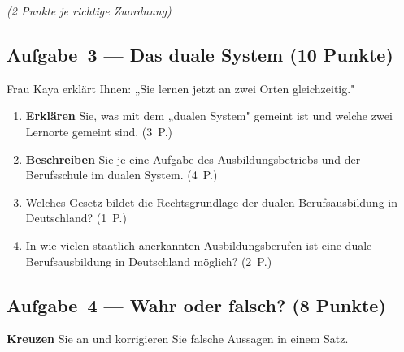 \documentclass[11pt, a4paper]{article}
\begin{document}
\medskip
\textit{(2 Punkte je richtige Zuordnung)}

\subsection*{Aufgabe~3 --- Das duale System (10 Punkte)}

Frau Kaya erklärt Ihnen: „Sie lernen jetzt an zwei Orten gleichzeitig."

\begin{enumerate}[label=(\alph*)]
  \item \textbf{Erklären} Sie, was mit dem „dualen System" gemeint ist und welche zwei Lernorte gemeint sind. \hfill (3~P.)

  \vspace{3cm}

  \item \textbf{Beschreiben} Sie je eine Aufgabe des Ausbildungsbetriebs und der Berufsschule im dualen System. \hfill (4~P.)

  \vspace{3cm}

  \item Welches Gesetz bildet die Rechtsgrundlage der dualen Berufsausbildung in Deutschland? \hfill (1~P.)

  \vspace{1.5cm}

  \item In wie vielen staatlich anerkannten Ausbildungsberufen ist eine duale Berufsausbildung in Deutschland möglich? \hfill (2~P.)

  \vspace{1.5cm}
\end{enumerate}

\subsection*{Aufgabe~4 --- Wahr oder falsch? (8 Punkte)}

\textbf{Kreuzen} Sie an und korrigieren Sie falsche Aussagen in einem Satz.
\end{document}
